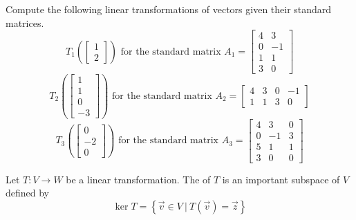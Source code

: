 \begin{activity}{15}
  Compute the following linear transformations of vectors given their
  standard matrices.
  \[
    T_1\left(\begin{bmatrix}1\\2\end{bmatrix}\right)
    \text{ for the standard matrix }
    A_1=\begin{bmatrix}4&3\\0&-1\\1&1\\3&0\end{bmatrix}
  \]
  \[
    T_2\left(\begin{bmatrix}1\\1\\0\\-3\end{bmatrix}\right)
    \text{ for the standard matrix }
    A_2=\begin{bmatrix}4&3&0&-1\\1&1&3&0\end{bmatrix}
  \]
  \[
    T_3\left(\begin{bmatrix}0\\-2\\0\end{bmatrix}\right)
    \text{ for the standard matrix }
    A_3=\begin{bmatrix}4&3&0\\0&-1&3\\5&1&1\\3&0&0\end{bmatrix}
  \]
\end{activity}


\begin{definition}
Let $T: V \rightarrow W$ be a linear transformation.  The  of $T$
is an important subspace of \(V\) defined by
\[
\ker T = \left\{ \vec{v} \in V\ \big|\ T(\vec{v})=\vec{z}\right\}
\]

\begin{center}
\end{center}
\end{definition}

